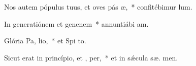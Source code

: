 \item Nos autem pópulus tuus, et oves pás æ,~* confitébimur   lum.
\item In generatiónem et genenem~* annuntiábi  am.
\item Glória Pa,  lio,~* et Spi to.
\item Sicut erat in princípio, et ,  per,~* et in sǽcula sæ. men.
